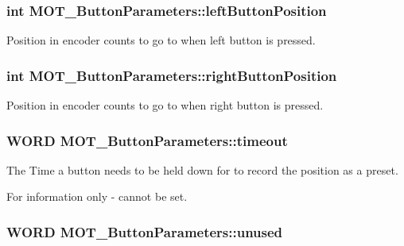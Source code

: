 \subsubsection[{\texorpdfstring{left\+Button\+Position}{leftButtonPosition}}]{\setlength{\rightskip}{0pt plus 5cm}int M\+O\+T\+\_\+\+Button\+Parameters\+::left\+Button\+Position}\hypertarget{struct_m_o_t___button_parameters_ab2056c54cd93d585a85a7d3356559545}{}\label{struct_m_o_t___button_parameters_ab2056c54cd93d585a85a7d3356559545}


Position in encoder counts to go to when left button is pressed. 

\subsubsection[{\texorpdfstring{right\+Button\+Position}{rightButtonPosition}}]{\setlength{\rightskip}{0pt plus 5cm}int M\+O\+T\+\_\+\+Button\+Parameters\+::right\+Button\+Position}\hypertarget{struct_m_o_t___button_parameters_aaa6a82b077940752de850c93710b9818}{}\label{struct_m_o_t___button_parameters_aaa6a82b077940752de850c93710b9818}


Position in encoder counts to go to when right button is pressed. 

\subsubsection[{\texorpdfstring{timeout}{timeout}}]{\setlength{\rightskip}{0pt plus 5cm}W\+O\+RD M\+O\+T\+\_\+\+Button\+Parameters\+::timeout}\hypertarget{struct_m_o_t___button_parameters_a6cb672c588b29986cd0be90c2bedea40}{}\label{struct_m_o_t___button_parameters_a6cb672c588b29986cd0be90c2bedea40}


The Time a button needs to be held down for to record the position as a preset. 

For information only -\/ cannot be set. 
\subsubsection[{\texorpdfstring{unused}{unused}}]{\setlength{\rightskip}{0pt plus 5cm}W\+O\+RD M\+O\+T\+\_\+\+Button\+Parameters\+::unused}\hypertarget{struct_m_o_t___button_parameters_aed9c9ca1156348e6095577ea4f803cb8}{}\label{struct_m_o_t___button_parameters_aed9c9ca1156348e6095577ea4f803cb8}



